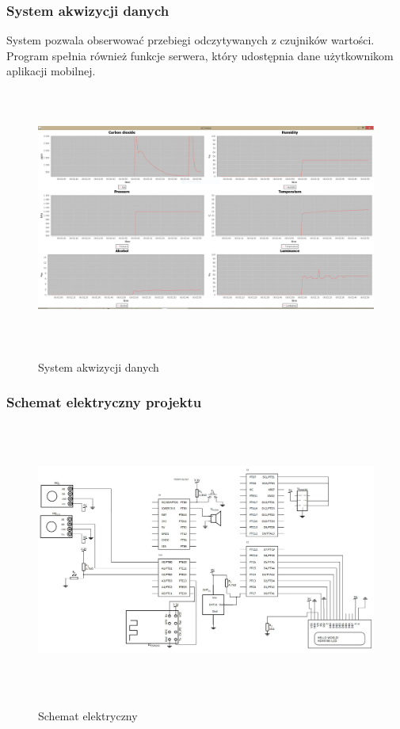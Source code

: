 \documentclass[12pt,a4paper]{article}
\begin{document}
\subsubsection{System akwizycji danych}
System pozwala obserwować przebiegi odczytywanych z czujników wartości. Program spełnia również funkcje serwera, który udostępnia dane użytkownikom aplikacji mobilnej.
\begin{figure}[!h]
	\centering
		\includegraphics[height =85mm]{wykresy.jpg}
		\label{wykresy}
		\caption{System akwizycji danych}
	\end{figure}
    
\subsubsection{Schemat elektryczny projektu}    
	\begin{figure}[!h]
	\centering
		\includegraphics[height =90mm]{schemat.jpg}
		\label{schemat}
		\caption{Schemat elektryczny}
	\end{figure}
	
\end{document}

